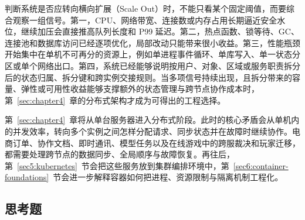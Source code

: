判断系统是否应转向横向扩展（Scale Out）时，不能只看某个固定阈值，而要综合观察一组信号。第一，CPU、网络带宽、连接数或内存占用长期逼近安全水位，继续加压会直接推高队列长度和 P99 延迟。第二，热点函数、锁等待、GC、连接池和数据库访问已经逐项优化，局部改动只能带来很小收益。第三，性能瓶颈开始集中在单机不可再分的资源上，例如单进程事件循环、单库写入、单一状态分区或单个网络出口。第四，系统已经能够说明按用户、对象、区域或服务职责拆分后的状态归属、拆分键和跨实例交接规则。当多项信号持续出现，且拆分带来的容量、弹性或可用性收益能够支撑额外的状态管理与跨节点协作成本时，第~\ref{sec:chapter4}~章的分布式架构才成为可得出的工程选择。

第~\ref{sec:chapter4}~章将从单台服务器进入分布式阶段。此时的核心矛盾会从单机内的并发效率，转向多个实例之间怎样分配请求、同步状态并在故障时继续协作。电商订单、协作文档、即时通讯、模型任务以及在线游戏中的跨服裁决和玩家迁移，都需要处理跨节点的数据同步、全局顺序与故障恢复。再往后，第~\ref{sec5:kubernetes}~节会把这些服务放到集群编排环境中，第~\ref{sec6:container-foundations}~节会进一步解释容器如何把进程、资源限制与隔离机制工程化。




\subsection{思考题}

